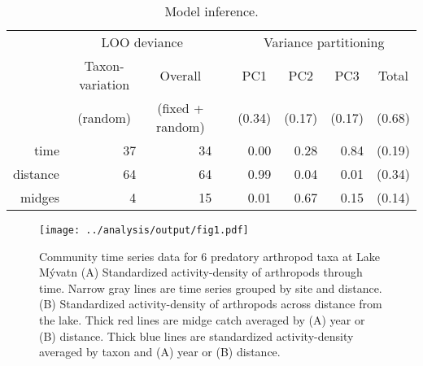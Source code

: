 \documentclass[12pt]{article}
\begin{document}

%
% 






\clearpage




\clearpage

\begin{table}
\caption{\label{tab:model-summary}Model inference.}
\begin{tabular}{rrrrrrrr}
\toprule
 & \multicolumn{2}{c}{LOO deviance} & & \multicolumn{4}{c}{Variance partitioning} \\
 \cmidrule{2-3} \cmidrule{5-8}
 & \multicolumn{1}{c}{Taxon-variation} & \multicolumn{1}{c}{Overall} & &
    \multicolumn{1}{c}{PC1} & \multicolumn{1}{c}{PC2} & \multicolumn{1}{c}{PC3} &
    \multicolumn{1}{c}{Total} \\
& \multicolumn{1}{c}{(random)} & \multicolumn{1}{c}{(fixed + random)} & &
    \multicolumn{1}{c}{(0.34)} & \multicolumn{1}{c}{(0.17)} &
    \multicolumn{1}{c}{(0.17)} & \multicolumn{1}{c}{(0.68)} \\
\midrule
time & 37 & 34 &  & 0.00 & 0.28 & 0.84 & (0.19)\\
distance & 64 & 64 &  & 0.99 & 0.04 & 0.01 & (0.34)\\
midges & 4 & 15 &  & 0.01 & 0.67 & 0.15 & (0.14)\\
\bottomrule
\end{tabular}
\end{table}


\clearpage

\begin{figure}
\centering
\texttt{[image: ../analysis/output/fig1.pdf]}
\caption{\label{fig:obs-data}
Community time series data for 6 predatory arthropod taxa at Lake M\'{y}vatn
(A) Standardized activity-density of arthropods through time.
Narrow gray lines are time series grouped by site and distance.
(B) Standardized activity-density of arthropods across distance from the lake.
Thick red lines are midge catch averaged by (A) year or (B) distance.
Thick blue lines are standardized activity-density averaged by taxon and
(A) year or (B) distance.
}
\end{figure}
\end{document}
